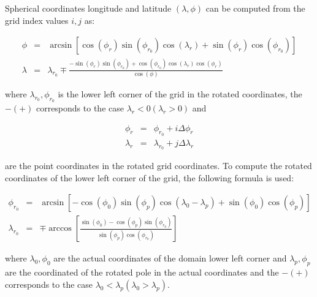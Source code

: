 Spherical coordinates longitude and latitude $(\lambda, \phi)$ can be computed
from the grid index values $i,j$ as:

\begin{eqnarray}
  \phi &=& \arcsin\left[ \cos(\phi_r) \sin(\phi_{r_0}) \cos(\lambda_r) +
           \sin(\phi_r) \cos(\phi_{r_0}) \right] \\
  \lambda &=& \lambda_{r_0} \mp \frac{-\sin(\phi_r) \sin(\phi_{r_0}) +
              \cos(\phi_{r_0}) \cos(\lambda_r) \cos(\phi_r)}{\cos(\phi)}
\end{eqnarray}

where $\lambda_{r_0},\phi_{r_0}$ is the lower left corner of the grid in
the rotated coordinates, the $- (+)$ corresponds to the case $\lambda_r < 0
(\lambda_r > 0)$ and

\begin{eqnarray}
  \phi_r &=& \phi_{r_0} + i \Delta\phi_r \\
  \lambda_r &=& \lambda_{r_0} + j \Delta\lambda_r
\end{eqnarray}

are the point coordinates in the rotated grid coordinates. To compute the
rotated coordinates of the lower left corner of the grid, the following
formula is used:

\begin{eqnarray}
  \phi_{r_0} &=& \arcsin \left[ -\cos(\phi_0) \sin(\phi_p)
           \cos(\lambda_0 - \lambda_p) + \sin(\phi_0) \cos(\phi_p)\right] \\
  \lambda_{r_0} &=& \mp \arccos \left[\frac{\sin(\phi_0) -
          \cos(\phi_p) \sin(\phi_{r_0})}{\sin(\phi_p) \cos(\phi_{r_0})}\right]
\end{eqnarray}

where $\lambda_0,\phi_0$ are the actual coordinates of the domain lower left
corner and $\lambda_p,\phi_p$ are the coordinated of the rotated pole in the
actual coordinates and the $- (+)$ corresponds to the case
$\lambda_0 < \lambda_p (\lambda_0 > \lambda_p)$.

